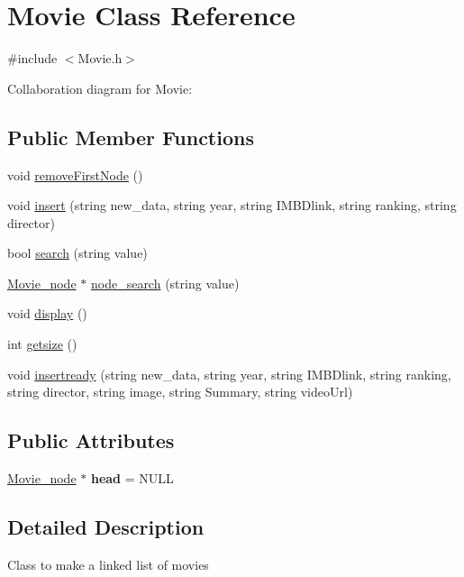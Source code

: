 \hypertarget{classMovie}{}\section{Movie Class Reference}
\label{classMovie}


{\ttfamily \#include $<$Movie.\+h$>$}



Collaboration diagram for Movie\+:
\subsection*{Public Member Functions}
\begin{DoxyCompactItemize}
\item 
void \hyperlink{classMovie_ab61d3e9aaffa732a591ef9dd0b8547c7}{remove\+First\+Node} ()
\item 
void \hyperlink{classMovie_ac77654f0f844f7ed5375a328870feb56}{insert} (string new\+\_\+data, string year, string I\+M\+B\+Dlink, string ranking, string director)
\item 
bool \hyperlink{classMovie_adf12d6f970ce999431b200deb2cd96e6}{search} (string value)
\item 
\hyperlink{classMovie__node}{Movie\+\_\+node} $\ast$ \hyperlink{classMovie_a5f3c64dc7e048522546172dd109e45a5}{node\+\_\+search} (string value)
\item 
void \hyperlink{classMovie_ac363bb217f26e9a82eda201df3985600}{display} ()
\item 
int \hyperlink{classMovie_af9b0909f4df25af7a9127211fbb17c1f}{getsize} ()
\item 
void \hyperlink{classMovie_af3e7d275618466e187fe13fc896e07a3}{insertready} (string new\+\_\+data, string year, string I\+M\+B\+Dlink, string ranking, string director, string image, string Summary, string video\+Url)
\end{DoxyCompactItemize}
\subsection*{Public Attributes}
\begin{DoxyCompactItemize}
\item 
\mbox{\label{classMovie_ad29efa57fc6ec1256c91626d3ea1e7b2}} 
\hyperlink{classMovie__node}{Movie\+\_\+node} $\ast$ {\bfseries head} = N\+U\+LL
\end{DoxyCompactItemize}


\subsection{Detailed Description}
Class to make a linked list of movies 

